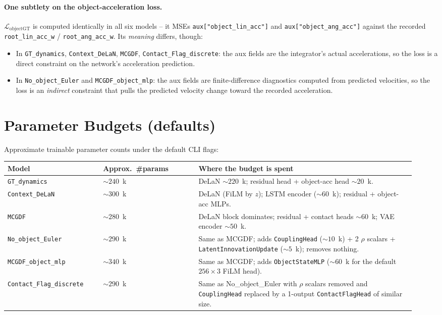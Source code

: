 \documentclass[11pt]{article}
\begin{document}
\paragraph{One subtlety on the object-acceleration loss.}
$\mathcal{L}_{\mathrm{objectGT}}$ is computed identically in all six
models -- it MSEs \texttt{aux["object\_lin\_acc"]} and
\texttt{aux["object\_ang\_acc"]} against the recorded
\texttt{root\_lin\_acc\_w} / \texttt{root\_ang\_acc\_w}.  Its
\emph{meaning} differs, though:
\begin{itemize}
  \item In \texttt{GT\_dynamics}, \texttt{Context\_DeLaN},
    \texttt{MCGDF}, \texttt{Contact\_Flag\_discrete}: the aux fields
    are the integrator's actual accelerations, so the loss is a
    direct constraint on the network's acceleration prediction.
  \item In \texttt{No\_object\_Euler} and
    \texttt{MCGDF\_object\_mlp}: the aux fields are
    finite-difference diagnostics computed from predicted
    velocities, so the loss is an \emph{indirect} constraint that
    pulls the predicted velocity change toward the recorded
    acceleration.
\end{itemize}

\section{Parameter Budgets (defaults)}

Approximate trainable parameter counts under the default CLI flags:

\begin{longtable}{p{0.22\linewidth} p{0.22\linewidth} p{0.50\linewidth}}
\toprule
Model & Approx.\ \#params & Where the budget is spent \\
\midrule
\texttt{GT\_dynamics}            & $\sim 240$~k                  & DeLaN $\sim 220$~k; residual head + object-acc head $\sim 20$~k. \\
\texttt{Context\_DeLaN}          & $\sim 300$~k                  & DeLaN (FiLM by $z$); LSTM encoder ($\sim 60$~k); residual + object-acc MLPs. \\
\texttt{MCGDF}                   & $\sim 280$~k                  & DeLaN block dominates; residual + contact heads $\sim 60$~k; VAE encoder $\sim 50$~k. \\
\texttt{No\_object\_Euler}       & $\sim 290$~k                  & Same as MCGDF; adds \texttt{CouplingHead} ($\sim 10$~k) + 2 $\rho$ scalars + \texttt{LatentInnovationUpdate} ($\sim 5$~k); removes nothing. \\
\texttt{MCGDF\_object\_mlp}      & $\sim 340$~k                  & Same as MCGDF; adds \texttt{ObjectStateMLP} ($\sim 60$~k for the default $256 \times 3$ FiLM head). \\
\texttt{Contact\_Flag\_discrete} & $\sim 290$~k                  & Same as No\_object\_Euler with $\rho$ scalars removed and \texttt{CouplingHead} replaced by a 1-output \texttt{ContactFlagHead} of similar size. \\
\bottomrule
\end{longtable}
\end{document}
